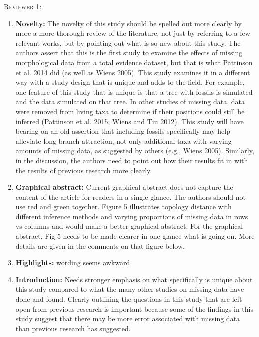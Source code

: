 \documentclass[12pt,letterpaper]{article}
\renewcommand{\section}[1]{%
\bigskip
\begin{center}
\begin{Large}
\normalfont\scshape #1
\medskip
\end{Large}
\end{center}}
\begin{document}
\section{Reviewer 1:}

\begin{enumerate}
\item{\textbf{Novelty:}} The novelty of this study should be spelled out more clearly by more a more thorough review of the literature, not just by referring to a few relevant works, but by pointing out what is so new about this study.
The authors assert that this is the first study to examine the effects of missing morphological data from a total evidence dataset, but that is what Pattinson et al. 2014 did (as well as Wiens 2005).
This study examines it in a different way with a study design that is unique and adds to the field. For example, one feature of this study that is unique is that a tree with fossils is simulated and the data simulated on that tree.
In other studies of missing data, data were removed from living taxa to determine if their positions could still be inferred (Pattinson et al. 2015; Wiens and Tiu 2012).
This study will have bearing on an old assertion that including fossils specifically may help alleviate long-branch attraction, not only additional taxa with varying amounts of missing data, as suggested by others (e.g., Wiens 2005).
Similarly, in the discussion, the authors need to point out how their results fit in with the results of previous research more clearly. 

\item{\textbf{Graphical abstract:}} Current graphical abstract does not capture the content of the article for readers in a single glance.
The authors should not use red and green together.
Figure 5 illustrates topology distance with different inference methods and varying proportions of missing data in rows vs columns and would make a better graphical abstract.
For the graphical abstract, Fig 5 needs to be made clearer in one glance what is going on.
More details are given in the comments on that figure below.

\item{\textbf{Highlights:}} wording seems awkward

\item{\textbf{Introduction:}} Needs stronger emphasis on what specifically is unique about this study compared to what the many other studies on missing data have done and found.
Clearly outlining the questions in this study that are left open from previous research is important because some of the findings in this study suggest that there may be more error associated with missing data than previous research has suggested.


\end{enumerate}
\end{document}
